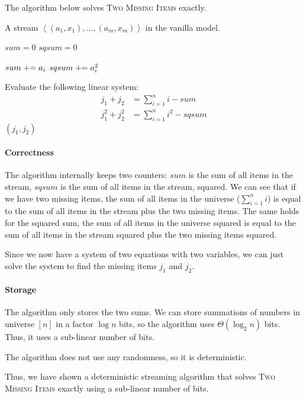 The algorithm below solves \textsc{Two Missing Items} exactly.

\begin{minipage}{\textwidth}
\begin{sourcecode}
A stream $\left<(a_1, x_1), \ldots , (a_m, x_m)\right>$ in the vanilla model.
\silend

$sum = 0$
$sqsum = 0$
\silend

$sum \mathrel{+}= a_i$
$sqsum \mathrel{+}= a_i^2$
\silend

Evaluate the following linear system: \begin{align*}j_1 + j_2 &= \sum_{i=1}^n{i} - sum\\ j_1^2 + j_2^2 &= \sum_{i=1}^n{i^2} - sqsum\end{align*}
\return $(j_1, j_2)$
\qend
\end{sourcecode}
\end{minipage}

\paragraph{Correctness} The algorithm internally keeps two counters: $sum$ is the sum of all items in the stream, $sqsum$ is the sum of all items in the stream, squared.
We can see that if we have two missing items, the sum of all items in the universe ($\sum_{i=1}^n{i}$) is equal to the sum of all items in the stream plus the two missing items.
The same holds for the squared sum, the sum of all items in the universe squared is equal to the sum of all items in the stream squared plus the two missing items squared.

Since we now have a system of two equations with two variables, we can just solve the system to find the missing items $j_1$ and $j_2$.

\paragraph{Storage} The algorithm only stores the two sums.
We can store summations of numbers in universe $[n]$ in a factor $\log{n}$ bits, so the algorithm uses $\Theta(\log_2{n})$ bits.
Thus, it uses a sub-linear number of bits.

The algorithm does not use any randomness, so it is deterministic.

Thus, we have shown a deterministic streaming algorithm that solves \textsc{Two Missing Items} exactly using a sub-linear number of bits.
